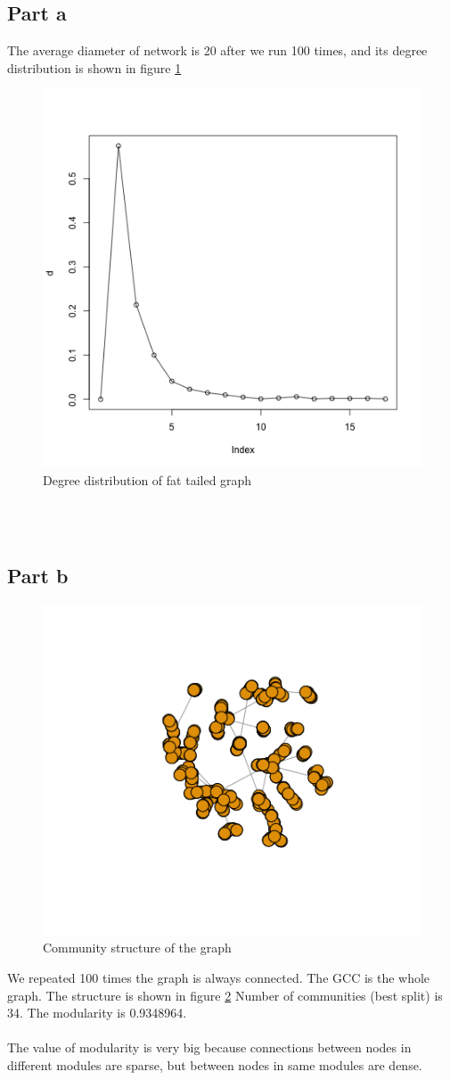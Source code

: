 \documentclass{article}
\begin{document}
\subsection{Part a}
The average diameter of network is 20 after we run 100 times, and its degree distribution is shown in figure \ref{fig:p2_1}
\begin{figure}[htbp]
\centering
\includegraphics[width=.6\textwidth]{p2_1.png}
\caption{Degree distribution of fat tailed graph}
\label{fig:p2_1}
\end{figure}\\
\\

\subsection{Part b}
\begin{figure}[htbp]
\centering
\includegraphics[width=.6\textwidth]{p2_2.png}
\caption{Community structure of the graph}
\label{fig:p2_2}
\end{figure}

\newpage
We repeated 100 times the graph is always connected.
The GCC is the whole graph. The structure is shown in figure \ref{fig:p2_2}
Number of communities (best split) is 34.
The modularity is 0.9348964.\\
\\
The value of modularity is very big because connections between nodes in different modules are sparse, but between nodes in same modules are dense. 
\end{document}
